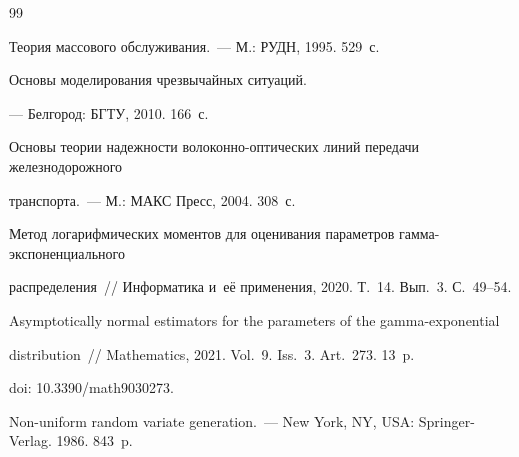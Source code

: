 {{\begin{thebibliography}{99}




Теория массового обслуживания.~--- М.: РУДН, 1995. 529~с.









Основы моделирования чрезвычайных ситуаций.




--- Белгород: БГТУ, 2010. 166~с.









Основы теории надежности во\-ло\-кон\-но-оп\-ти\-че\-ских линий передачи железнодорожного 


транспорта.~--- М.: МАКС Пресс, 2004. 308~с.









Метод логарифмических моментов для оценивания па\-ра\-мет\-ров гам\-ма-экс\-по\-нен\-ци\-аль\-но\-го 


распределения~/\!\!/ Информатика и~её применения, 2020. Т.~14. Вып.~3. С.~49--54.









Asymptotically normal estimators for the parameters of the gamma-exponential 


distribution~/\!\!/ Mathematics, 2021. Vol.~9. Iss.~3. Art.~273. 13~p. 


doi: 10.3390\!/\!math9030273.









Non-uniform random variate generation.~--- New York, NY, USA: Springer-Verlag. 1986. 843~p.






\end{thebibliography}}}
